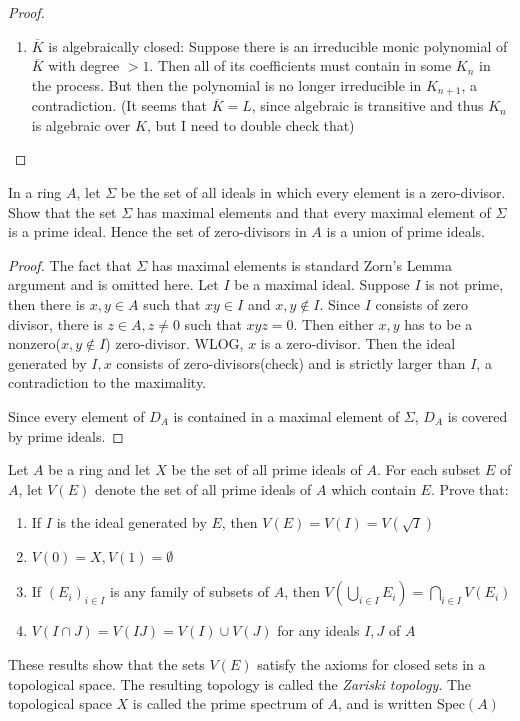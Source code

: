 \documentclass{solution}
\begin{document}
\begin{proof}
\begin{enumerate}
\begin{enumerate}
            \item $\overline{K}$ is algebraically closed: Suppose there is an irreducible monic polynomial of $\overline{K}$ with degree $\gt 1$. Then all of its coefficients must contain in some $K_n$ in the process. But then the polynomial is no longer irreducible in $K_{n + 1}$, a contradiction. (It seems that $\overline{K} = L$, since algebraic is transitive and thus $K_n$ is algebraic over $K$, but I need to double check that)
        \end{enumerate}
    \end{enumerate}
\end{proof}

\begin{problem}
    In a ring $A$, let $\Sigma$ be the set of all ideals in which every element is a zero-divisor. Show that the set $\Sigma$ has maximal elements and that every maximal element of $\Sigma$ is a prime ideal. Hence the set of zero-divisors in $A$ is a union of prime ideals.
\end{problem}

\begin{proof}
    The fact that $\Sigma$ has maximal elements is standard Zorn's Lemma argument and is omitted here. Let $I$ be a maximal ideal. Suppose $I$ is not prime, then there is $x, y \in A$ such that $xy \in I$ and $x, y \notin I$. Since $I$ consists of zero divisor, there is $z \in A, z \ne 0$ such that $xyz = 0$. Then either $x, y$ has to be a nonzero($x, y \notin I$) zero-divisor. WLOG, $x$ is a zero-divisor. Then the ideal generated by $I, x$ consists of zero-divisors(check) and is strictly larger than $I$, a contradiction to the maximality.

    Since every element of $D_A$ is contained in a maximal element of $\Sigma$, $D_A$ is covered by prime ideals.
\end{proof}

\begin{problem}
    Let $A$ be a ring and let $X$ be the set of all prime ideals of $A$. For each subset $E$ of $A$, let $V(E)$ denote the set of all prime ideals of $A$ which contain $E$. Prove that:
    \begin{enumerate}
        \item If $I$ is the ideal generated by $E$, then $V(E) = V(I) = V(\sqrt{I})$
        \item $V(0) = X, V(1) = \emptyset$
        \item If $(E_i)_{i \in I}$ is any family of subsets of $A$, then $V(\bigcup\limits_{i \in I} E_i) = \bigcap\limits_{i \in I} V(E_i)$
        \item $V(I \cap J) = V(IJ) = V(I) \cup V(J)$ for any ideals $I, J$ of $A$
    \end{enumerate}

    These results show that the sets $V(E)$ satisfy the axioms for closed sets in a topological space. The resulting topology is called the \textit{Zariski topology}. The topological space $X$ is called the prime spectrum of $A$, and is written $\mathrm{Spec}(A)$
\end{problem}
\end{document}
